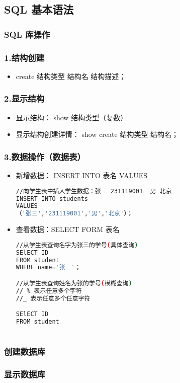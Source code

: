 
\begin{issues}
\issueDraft
\end{issues}

\subsection{SQL 基本语法}

\subsubsection{SQL 库操作}
\subsubsection{1.结构创建}
\begin{itemize}
\item create 结构类型 结构名 结构描述；
\end{itemize}
\subsubsection{2.显示结构}
\begin{itemize}
\item 显示结构： show 结构类型（复数）
\item 显示结构创建详情： show create 结构类型 结构名；
\end{itemize}
\subsubsection{3.数据操作（数据表）}
\begin{itemize}
\item 新增数据： INSERT INTO 表名 VALUES
\begin{lstlisting}[language=bash]
//向学生表中插入学生数据：张三 231119001  男 北京
INSERT INTO students
VALUES
（'张三','231119001','男','北京'）；
\end{lstlisting}

\item 查看数据：SELECT FORM 表名 
\begin{lstlisting}[language=bash]
//从学生表查询名字为张三的学号(具体查询)
SElECT ID
FROM student
WHERE name='张三'；

//从学生表查询姓名为张的学号(模糊查询)
// % 表示任意多个字符
//_ 表示任意多个任意字符

SElECT ID
FROM student



\end{lstlisting}
\end{itemize}


\subsubsection{创建数据库}
\subsubsection{显示数据库}
